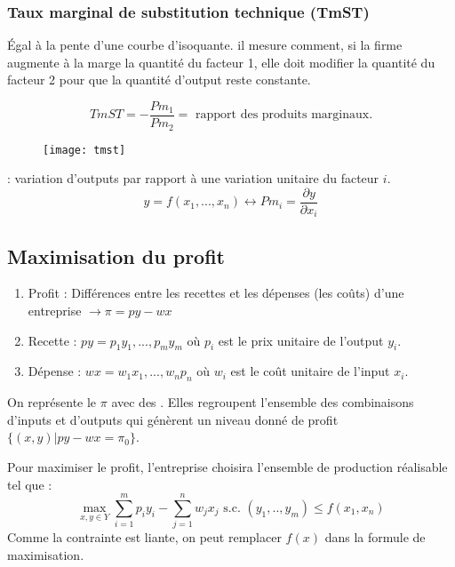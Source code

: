 \subsubsection{Taux marginal de substitution technique (TmST)}

Égal à la pente d'une courbe d'isoquante. il mesure comment, si la firme augmente à la marge la quantité du facteur 1, elle doit modifier la quantité du facteur 2 pour que la quantité d'output reste constante.

\begin{equation*}
TmST = - \frac{Pm_1}{Pm_2} = \text{ rapport des produits marginaux.}
\end{equation*}

\begin{figure}[H]
	\centering
	\texttt{[image: tmst]}
\end{figure}

 : variation d'outputs par rapport à une variation unitaire du facteur $i$.
\begin{equation*}
y = f(x_1, ..., x_n) \leftrightarrow Pm_i = \frac{\partial y}{\partial x_i}
\end{equation*}

\subsection{Maximisation du profit}

\begin{enumerate}
\item Profit : Différences entre les recettes et les dépenses (les coûts) d'une entreprise $\rightarrow \pi = py - wx$
\item Recette : $py = p_1y_1, ..., p_my_m$ où $p_i$ est le prix unitaire de l'output $y_i$.
\item Dépense : $wx = w_1x_1, ..., w_n p_n$ où $w_i$ est le coût unitaire de l'input $x_i$.
\end{enumerate}

On représente le $\pi$ avec des . Elles regroupent l'ensemble des combinaisons d'inputs et d'outputs qui génèrent un niveau donné de profit $\{(x, y) | py - wx = \pi_0\}$.

Pour maximiser le profit, l'entreprise choisira l'ensemble de production réalisable tel que :
\begin{equation*}
\max_{x, y \in Y} \sum_{i = 1}^m p_i y_i - \sum_{j=1}^n w_j x_j \text{ s.c. } (y_1, .., y_m) \leq f(x_1, x_n)
\end{equation*}
Comme la contrainte est liante, on peut remplacer $f(x)$ dans la formule de maximisation.

